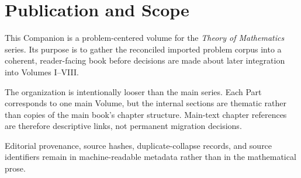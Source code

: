 \chapter*{Publication and Scope}

This Companion is a problem-centered volume for the \emph{Theory of Mathematics} series.
Its purpose is to gather the reconciled imported problem corpus into a coherent,
reader-facing book before decisions are made about later integration into Volumes I--VIII.

The organization is intentionally looser than the main series. Each Part corresponds to
one main Volume, but the internal sections are thematic rather than copies of the main
book's chapter structure. Main-text chapter references are therefore descriptive links,
not permanent migration decisions.

Editorial provenance, source hashes, duplicate-collapse records, and source identifiers
remain in machine-readable metadata rather than in the mathematical prose.
